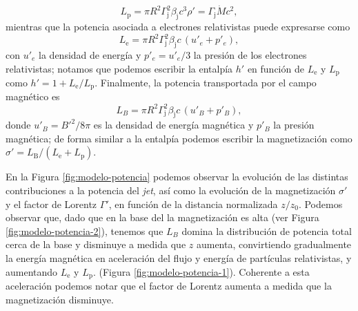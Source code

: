 \begin{equation}\label{eq:mod-12}
    L_\mathrm{p}=\pi R^2\Gamma_\text{j}^2\beta_\text{j}c^3\rho'=\Gamma_\text{j}\dot{M}c^2,
\end{equation}
mientras que la potencia asociada a electrones relativistas puede expresarse como
\begin{equation}\label{eq:mod-13}
    L_\mathrm{e} = \pi R^2 \Gamma_\mathrm{j}^2 \beta_\mathrm{j} c \, (u'_e + p'_e),
\end{equation}
con $u'_e$ la densidad de energía y $p'_e=u'_e/3$ la presi\'on de los electrones relativistas; notamos que podemos escribir la entalpía $h'$ en función de $L_\mathrm{e}$ y $L_\mathrm{p}$ como $h'=1+L_\mathrm{e}/L_\mathrm{p}$.
	Finalmente, la potencia transportada por el campo magnético es
\begin{equation}\label{eq:mod-14}
    L_B = \pi R^2 \Gamma_\mathrm{j}^2 \beta_\mathrm{j} c \, (u'_B + p'_B),
\end{equation}
donde $u'_B = B'^2 / 8\pi$ es la densidad de energía magnética y $p'_B$ la presión magnética; de forma similar a la entalp\'ia podemos escribir la magnetizaci\'on como $\sigma'=L_\text{B}/(L_\text{e}+L_\text{p}).$

	En la Figura \ref{fig:modelo-potencia} podemos observar la evolución de las distintas contribuciones a la potencia del \textit{jet}, as\'i como la evoluci\'on de la magnetizaci\'on $\sigma'$ y el factor de Lorentz $\Gamma'$, en función de la distancia normalizada $z/z_0$. Podemos observar que, dado que en la base del \jet la magnetizaci\'on es alta (ver Figura \ref{fig:modelo-potencia-2}), tenemos que $L_B$ domina la distribuci\'on de potencia total cerca de la base y disminuye a medida que $z$ aumenta, convirtiendo gradualmente la energ\'ia magnética en aceleración del flujo y energ\'ia de partículas relativistas, y aumentando $L_\text{e}$ y $L_\text{p}.$ (Figura \ref{fig:modelo-potencia-1}). Coherente a esta aceleraci\'on podemos notar que el factor de Lorentz aumenta a medida que la magnetizaci\'on disminuye.


